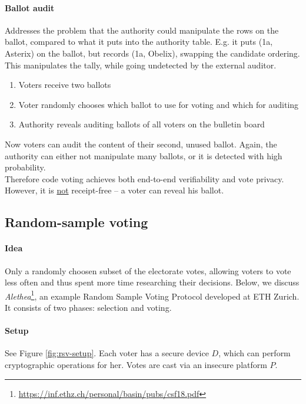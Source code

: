 \paragraph{Ballot audit} Addresses the problem that the authority could manipulate the rows on the ballot, compared to what it puts into the authority table. E.g. it puts (1a, Asterix) on the ballot, but records (1a, Obelix), swapping the candidate ordering. This manipulates the tally, while going undetected by the external auditor.
\begin{enumerate}
    \item Voters receive two ballots
    \item Voter randomly chooses which ballot to use for voting and which for auditing
    \item Authority reveals auditing ballots of all voters on the bulletin board
\end{enumerate}
Now voters can audit the content of their second, unused ballot.
Again, the authority can either not manipulate many ballots, or it is detected with high probability.
\\

Therefore code voting achieves both end-to-end verifiability and vote privacy. However, it is \underline{not} receipt-free -- a voter can reveal his ballot.


\subsection{Random-sample voting}

\paragraph{Idea} Only a randomly choosen subset of the electorate votes, allowing voters to vote less often and thus spent more time researching their decisions. Below, we discuss \emph{Alethea}\footnote{ \href{https://inf.ethz.ch/personal/basin/pubs/csf18.pdf}{https://inf.ethz.ch/personal/basin/pubs/csf18.pdf}}, an example Random Sample Voting Protocol developed at ETH Zurich. It consists of two phases: selection and voting.

\paragraph{Setup} See Figure \ref{fig:rsv-setup}. Each voter has a secure device $D$, which can perform cryptographic operations for her. Votes are cast via an insecure platform $P$.

